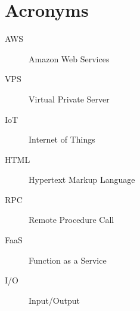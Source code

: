 \documentclass[../main.tex]{subfiles}
\begin{document}
\chapter{Acronyms}

\begin{description}
  \item[AWS] Amazon Web Services
  \item[VPS] Virtual Private Server
  \item[IoT] Internet of Things
  \item[HTML] Hypertext Markup Language
  \item[RPC] Remote Procedure Call
  \item[FaaS] Function as a Service
  \item[I/O] Input/Output
\end{description}

\end{document}
